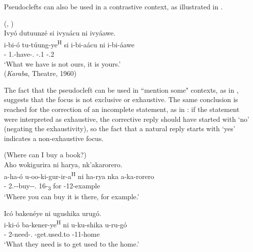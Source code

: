 \documentclass[output=paper]{langscibook}
\begin{document}

\z
\z

Pseudoclefts can also be used in a contrastive context, as illustrated in .

\ea
\label{bkm:Ref119734770}
(\citealt[246]{Nshemezimana2016}, \citealt[91]{LafkiouiEtAl2016})\\
Ivyó dutuunzé si ivyaácu ni ivyáawe.\\
\gll
i-bi-ó  tu-túung-ye\textsuperscript{H} si  i-bi-aácu ni  i-bi-áawe \\
-\PRCS{}  1\PL.\SM{}-have-\PFV.\REL{}  \COP{}  -\POSS.1\PL{} \COP{}  -\POSS.2\SG{} \\
\glt
‘What we have is not ours, it is yours.’\\
(\textit{Karaba}, Theatre, 1960)\\

\z

The fact that the pseudocleft can be used in ``mention some" contexts, as in , suggests that the focus is not exclusive or exhaustive. The same conclusion is reached for the correction of an incomplete statement, as in : if the statement were interpreted as exhaustive, the corrective reply should have started with ‘no’ (negating the exhaustivity), so the fact that a natural reply starts with ‘yes’ indicates a non-exhaustive focus.

\ea
\label{bkm:Ref79138286}
(Where can I buy a book?)\\
Aho wokigurira ni harya, nk’akarorero.\\
\gll
a-ha-ó  u-oo-ki-gur-ir-a\textsuperscript{H}  ni  ha-rya  nka  a-ka-rorero\\
-\PRO{}  2\SG.\SM-\OM{}-buy-\APPL-\FV.\REL{}  \COP{}  16-\DEM{}\textsubscript{3}  for  \AUG-{}12-example\\
\glt
‘Where you can buy it is there, for example.’\\

\z

\ea
\ea
\label{bkm:Ref79138377}
Icó bakenéye ni ugushika urugó.\\
\gll
i-ki-ó  ba-kener-ye\textsuperscript{H}  ni  u-ku-shika  u-ru-gó\\
-\PRO{}  2\SM{}-need-\PFV.\REL{}  \COP{}  -get.used.to  \AUG{}-11-home\\
\glt
‘What they need is to get used to the home.’\\
\end{document}
